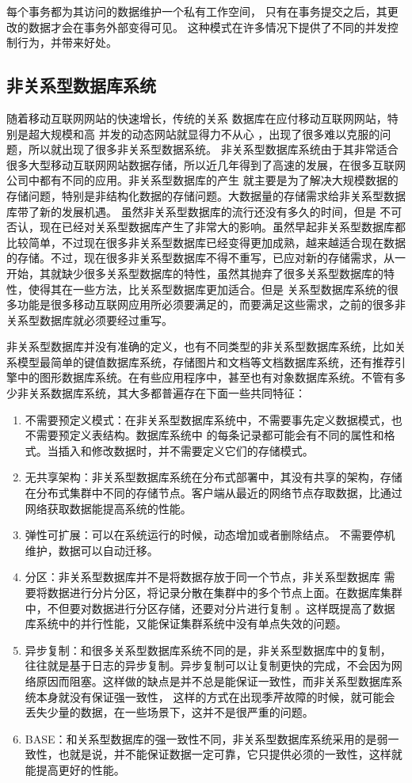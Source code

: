 每个事务都为其访问的数据维护一个私有工作空间，
只有在事务提交之后，其更改的数据才会在事务外部变得可见。
这种模式在许多情况下提供了不同的并发控制行为，并带来好处。
\subsection{非关系型数据库系统}
随着移动互联网网站的快速增长，传统的关系
数据库在应付移动互联网网站，特别是超大规模和高
并发的动态网站就显得力不从心
，出现了很多难以克服的问题，所以就出现了很多非关系型数据系统。
非关系型数据库系统由于其非常适合很多大型移动互联网网站数据存储，所以近几年得到了高速的发展，在很多互联网公司中都有不同的应用。非关系型数据库的产生
就主要是为了解决大规模数据的存储问题，特别是非结构化数据的存储问题。大数据量的存储需求给非关系型数据库带了新的发展机遇。
虽然非关系型数据库的流行还没有多久的时间，但是
不可否认，现在已经对关系型数据库产生了非常大的影响。虽然早起非关系型数据库都比较简单，不过现在很多非关系型数据库已经变得更加成熟，越来越适合现在数据的存储。不过，现在很多非关系型数据库不得不重写，已应对新的存储需求，从一开始，其就缺少很多关系型数据库的特性，虽然其抛弃了很多关系型数据库的特性，使得其在一些方法，比关系型数据库更加适合。但是
关系型数据库系统的很多功能是很多移动互联网应用所必须要满足的，而要满足这些需求，之前的很多非关系型数据库就必须要经过重写。

非关系型数据库并没有准确的定义，也有不同类型的非关系型数据库系统，比如关系模型最简单的键值数据库系统，存储图片和文档等文档数据库系统，还有推荐引擎中的图形数据库系统。在有些应用程序中，甚至也有对象数据库系统。不管有多少非关系数据库系统，其大多都普遍存在下面一些共同特征：
\begin{enumerate}[fullwidth,itemindent=2em]
	\item   不需要预定义模式：在非关系型数据库系统中，不需要事先定义数据模式，也不需要预定义表结构。数据库系统中
	的每条记录都可能会有不同的属性和格式。当插入和修改数据时，并不需要定义它们的存储模式。
\item 	无共享架构：非关系型数据库系统在分布式部署中，其没有共享的架构，存储在分布式集群中不同的存储节点。客户端从最近的网络节点存取数据，比通过网络获取数据能提高系统的性能。
\item 	弹性可扩展：可以在系统运行的时候，动态增加或者删除结点。
不需要停机维护，数据可以自动迁移。
\item 	分区：非关系型数据库并不是将数据存放于同一个节点，非关系型数据库
需要将数据进行分片分区，将记录分散在集群中的多个节点上面。在数据库集群中，不但要对数据进行分区存储，还要对分片进行复制
。这样既提高了数据库系统中的并行性能，又能保证集群系统中没有单点失效的问题。
\item 	异步复制：和很多关系型数据库系统不同的是，非关系型数据库中的复制，
往往就是基于日志的异步复制。异步复制可以让复制更快的完成，不会因为网络原因而阻塞。这样做的缺点是并不总是能保证一致性，而非关系型数据库系统本身就没有保证强一致性，
这样的方式在出现季芹故障的时候，就可能会丢失少量的数据，在一些场景下，这并不是很严重的问题。
\item 	BASE：和关系型数据库的强一致性不同，非关系型数据库系统采用的是弱一致性，也就是说，并不能保证数据一定可靠，它只提供必须的一致性，这样就能提高更好的性能。
\end{enumerate}
